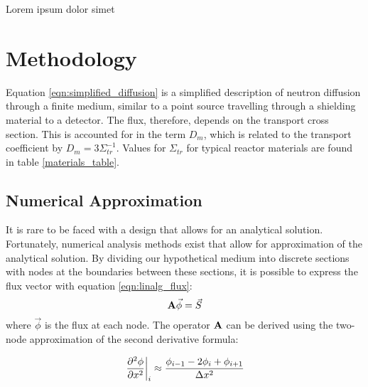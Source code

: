 \documentclass[../main.tex]{subfiles}
\begin{document}
Lorem ipsum dolor simet

\section{Methodology}
	Equation \ref{eqn:simplified_diffusion} is a simplified description of neutron diffusion through a finite medium, similar to a point source travelling through a shielding material to a detector. The flux, therefore, depends on the transport cross section. This is accounted for in the term $D_m$, which is related to the transport coefficient by $D_m = 3 \Sigma_{tr}^{-1}$. Values for $\Sigma_{tr}$ for typical reactor materials are found in table \ref{materials_table}. 

	
\subsection{Numerical Approximation} \label{ssec:numerical}
	It is rare to be faced with a design that allows for an analytical solution. Fortunately, numerical analysis methods exist that allow for approximation of the analytical solution. By dividing our hypothetical medium into discrete sections with nodes at the boundaries between these sections, it is possible to express the flux vector with equation \ref{eqn:linalg_flux}:
	\begin{equation}
		\mathbf{A} \vec{\phi} = \vec{S}
		\label{eqn:linalg_flux}
	\end{equation}
	where $\vec{\phi}$ is the flux at each node. The operator $\mathbf{A}$ can be derived using the two-node approximation of the  second derivative formula:
	
	\begin{equation*}
		\left. \pdv[2]{\phi}{x} \right|_i \approx \frac{\phi_{i-1} - 2\phi_i + \phi_{i+1}}{\Delta x^2}
	\end{equation*}
\end{document}

